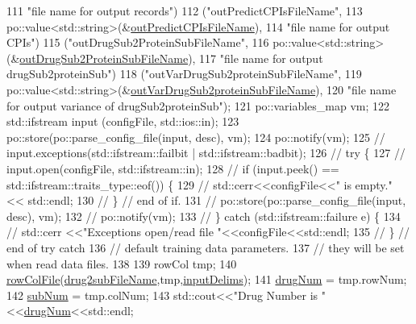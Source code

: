 \begin{DoxyCode}
111        \textcolor{stringliteral}{"file name for output records"})
112       (\textcolor{stringliteral}{"outPredictCPIsFileName"},
113        po::value<std::string>(&\hyperlink{classgift_1_1parameters_a442c2f11e4ce40f1ab51174a7d2408c1}{outPredictCPIsFileName}),
114        \textcolor{stringliteral}{"file name for output CPIs"})
115       (\textcolor{stringliteral}{"outDrugSub2ProteinSubFileName"},
116        po::value<std::string>(&\hyperlink{classgift_1_1parameters_a5e40e69f82af3c62071f391d0c932fe6}{outDrugSub2ProteinSubFileName}),
117        \textcolor{stringliteral}{"file name for output drugSub2proteinSub"})
118       (\textcolor{stringliteral}{"outVarDrugSub2proteinSubFileName"},
119        po::value<std::string>(&\hyperlink{classgift_1_1parameters_a1d5bd85d510a847e22e47e2bdebebf39}{outVarDrugSub2proteinSubFileName}),
120        \textcolor{stringliteral}{"file name for output variance of drugSub2proteinSub"});
121     po::variables\_map vm;
122     std::ifstream input (configFile, std::ios::in);
123     po::store(po::parse\_config\_file(input, desc), vm);
124     po::notify(vm);
125     \textcolor{comment}{// input.exceptions(std::ifstream::failbit | std::ifstream::badbit);}
126     \textcolor{comment}{// try \{}
127     \textcolor{comment}{//   input.open(configFile, std::ifstream::in);}
128     \textcolor{comment}{//   if (input.peek() == std::ifstream::traits\_type::eof()) \{}
129     \textcolor{comment}{//     std::cerr<<configFile<<" is empty." << std::endl;}
130     \textcolor{comment}{//   \} // end of if.}
131     \textcolor{comment}{//   po::store(po::parse\_config\_file(input, desc), vm);}
132     \textcolor{comment}{//   po::notify(vm);}
133     \textcolor{comment}{// \} catch (std::ifstream::failure e) \{}
134     \textcolor{comment}{//   std::cerr <<"Exceptions open/read file "<<configFile<<std::endl;}
135     \textcolor{comment}{// \} // end of try catch}
136     \textcolor{comment}{// default training data parameters.}
137     \textcolor{comment}{// they will be set when read data files.}
138 
139     rowCol tmp;
140     \hyperlink{namespacegift_a56a9882f4dbf0b4a9ddcdbb0b402ded3}{rowColFile}(\hyperlink{classgift_1_1parameters_aa27081bc09725a965312c44ea26e4ba8}{drug2subFileName},tmp,\hyperlink{classgift_1_1parameters_a35680722bd40ee2cb5434ca7736e9bac}{inputDelims});
141     \hyperlink{classgift_1_1parameters_a207a63e1ef9ef9b9d802c452029e27fa}{drugNum} = tmp.rowNum;
142     \hyperlink{classgift_1_1parameters_a3736b9054e162bc4bf63d018744ff0c3}{subNum} = tmp.colNum;
143     std::cout<<\textcolor{stringliteral}{"Drug Number is "}<<\hyperlink{classgift_1_1parameters_a207a63e1ef9ef9b9d802c452029e27fa}{drugNum}<<std::endl;

\end{DoxyCode}
